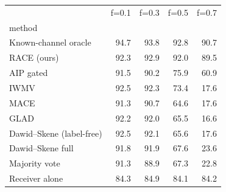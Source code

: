 \begin{tabular}{lrrrr}
\toprule
 & f=0.1 & f=0.3 & f=0.5 & f=0.7 \\
method &  &  &  &  \\
\midrule
Known-channel oracle & 94.7 & 93.8 & 92.8 & 90.7 \\
RACE (ours) & 92.3 & 92.9 & 92.0 & 89.5 \\
AIP gated & 91.5 & 90.2 & 75.9 & 60.9 \\
IWMV & 92.5 & 92.3 & 73.4 & 17.6 \\
MACE & 91.3 & 90.7 & 64.6 & 17.6 \\
GLAD & 92.2 & 92.0 & 65.5 & 16.6 \\
Dawid–Skene (label-free) & 92.5 & 92.1 & 65.6 & 17.6 \\
Dawid–Skene full & 91.8 & 91.9 & 67.6 & 23.6 \\
Majority vote & 91.3 & 88.9 & 67.3 & 22.8 \\
Receiver alone & 84.3 & 84.9 & 84.1 & 84.2 \\
\bottomrule
\end{tabular}

